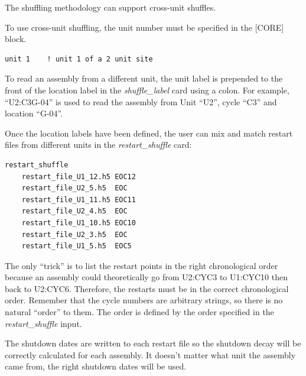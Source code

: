 The shuffling methodology can support cross-unit shuffles.

To use cross-unit shuffling, the unit number must be specified in the [CORE] block.
\begin{Verbatim}[fontsize=\small]
  unit 1    ! unit 1 of a 2 unit site
\end{Verbatim}

To read an assembly from a different unit, the unit label is prepended to the front of the location label
in the {\it shuffle\_label} card using a colon.
For example, ``U2:C3G-04'' is used to read the assembly from Unit ``U2'', cycle ``C3'' and location ``G-04''.

Once the location labels have been defined, the user can mix and match restart files from different units
in the {\it restart\_shuffle} card:
\begin{Verbatim}[fontsize=\small]
  restart_shuffle
    restart_file_U1_12.h5 EOC12
    restart_file_U2_5.h5  EOC
    restart_file_U1_11.h5 EOC11
    restart_file_U2_4.h5  EOC
    restart_file_U1_10.h5 EOC10
    restart_file_U2_3.h5  EOC
    restart_file_U1_5.h5  EOC5
\end{Verbatim}
The only ``trick'' is to list the restart points in the right chronological order because an
assembly could theoretically go from U2:CYC3 to U1:CYC10 then back to U2:CYC6.  Therefore, the restarts
must be in the correct chronological order.  Remember that the cycle numbers are arbitrary strings,
so there is no natural ``order'' to them.  The order is defined by the order specified in the
{\it restart\_shuffle} input.

The shutdown dates are written to each restart file so the shutdown decay will be correctly
calculated for each assembly.
It doesn't matter what unit the assembly came from, the right shutdown dates will be used.


